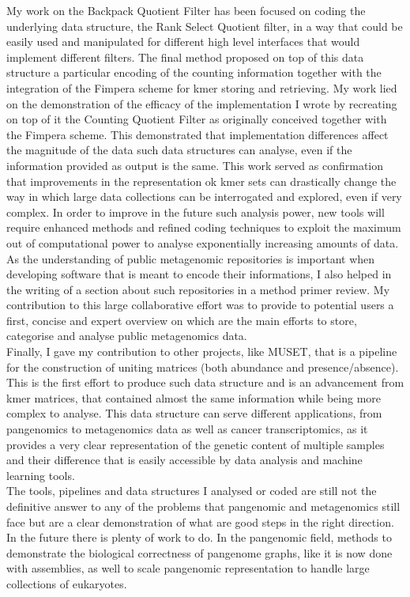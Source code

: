 My work on the Backpack Quotient Filter has been focused on coding the underlying data structure, the Rank Select Quotient filter, in a way that could be easily used and manipulated for different high level interfaces that would implement different filters. The final method proposed on top of this data structure a particular encoding of the counting information together with the integration of the Fimpera scheme for kmer storing and retrieving. My work lied on the demonstration of the efficacy of the implementation I wrote by recreating on top of it the Counting Quotient Filter as originally conceived together with the Fimpera scheme. This demonstrated that implementation differences affect the magnitude of the data such data structures can analyse, even if the information provided as output is the same. This work served as confirmation that  improvements in the representation ok kmer sets can drastically change the way in which large data collections can be interrogated and explored, even if very complex. In order to improve in the future such analysis power, new tools will require enhanced methods and refined coding techniques to exploit the maximum out of computational power to analyse exponentially increasing amounts of data.\\
As the understanding of public metagenomic repositories is important when developing software that is meant to encode their informations, I also helped in the writing of a section about such repositories in a method primer review. My contribution to this large collaborative effort was to provide to potential users a first, concise and expert overview on which are the main efforts to store, categorise and analyse public metagenomics data.\\
Finally, I gave my contribution to other projects, like MUSET, that is a pipeline for the construction of uniting matrices (both abundance and presence/absence). This is the first effort to produce such data structure and is an advancement from kmer matrices, that contained almost the same information while being more complex to analyse. This data structure can serve different applications, from pangenomics to metagenomics data as well as cancer transcriptomics, as it provides a very clear representation of the genetic content of multiple samples and their difference that is easily accessible by data analysis and machine learning tools.\\
The tools, pipelines and data structures I analysed or coded are still not the definitive answer to any of the problems that pangenomic and metagenomics still face but are a clear demonstration of what are good steps in the right direction. In the future there is plenty of work to do. In the pangenomic field, methods to demonstrate the biological correctness of pangenome graphs, like it is now done with assemblies, as well to scale pangenomic representation to handle large collections of eukaryotes.
